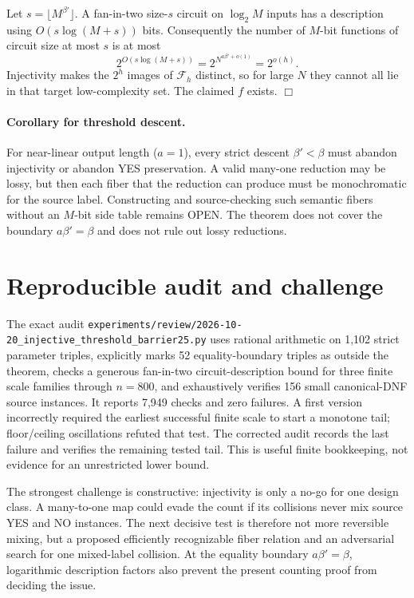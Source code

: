 \documentclass[11pt]{article}
\begin{document}
Let $s=\lfloor M^{\beta'}\rfloor$.  A fan-in-two size-$s$ circuit on
$\log_2M$ inputs has a description using $O(s\log(M+s))$ bits.  Consequently
the number of $M$-bit functions of circuit size at most $s$ is at most
\[
  2^{O(s\log(M+s))}
  =2^{N^{a\beta'+o(1)}}
  =2^{o(h)}.
\]
Injectivity makes the $2^h$ images of $\mathcal F_h$ distinct, so for large
$N$ they cannot all lie in that target low-complexity set.  The claimed $f$
exists. \hfill$\Box$

\paragraph{Corollary for threshold descent.}
For near-linear output length ($a=1$), every strict descent
$\beta'<\beta$ must abandon injectivity or abandon YES preservation.  A valid
many-one reduction may be lossy, but then each fiber that the reduction can
produce must be monochromatic for the source label.  Constructing and
source-checking such semantic fibers without an $M$-bit side table remains
OPEN.  The theorem does not cover the boundary $a\beta'=\beta$ and does not
rule out lossy reductions.

\section*{Reproducible audit and challenge}
The exact audit
\texttt{experiments/review/2026-10-20\_injective\_threshold\_barrier25.py}
uses rational arithmetic on 1,102 strict parameter triples, explicitly marks
52 equality-boundary triples as outside the theorem, checks a generous
fan-in-two circuit-description bound for three finite scale families through
$n=800$, and exhaustively verifies 156 small canonical-DNF source instances.
It reports 7,949 checks and zero failures.  A first version incorrectly
required the earliest successful finite scale to start a monotone tail;
floor/ceiling oscillations refuted that test.  The corrected audit records the
last failure and verifies the remaining tested tail.  This is useful finite
bookkeeping, not evidence for an unrestricted lower bound.

The strongest challenge is constructive: injectivity is only a no-go for one
design class.  A many-to-one map could evade the count if its collisions never
mix source YES and NO instances.  The next decisive test is therefore not
more reversible mixing, but a proposed efficiently recognizable fiber relation
and an adversarial search for one mixed-label collision.  At the equality
boundary $a\beta'=\beta$, logarithmic description factors also prevent the
present counting proof from deciding the issue.
\end{document}
